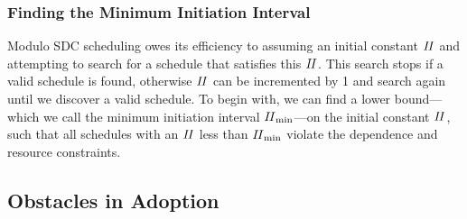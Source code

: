 \subsubsection{Finding the Minimum Initiation Interval}

Modulo SDC scheduling owes its efficiency to assuming an initial constant $\mathit{II}$
and attempting to search for a schedule that satisfies this $\mathit{II}$.  This search
stops if a valid schedule is found, otherwise $\mathit{II}$ can be incremented by 1 and
search again until we discover a valid schedule.  To begin with, we can find
a lower bound---which we call the minimum initiation interval $\mathit{II}_{\rm min}$---on the
initial constant $\mathit{II}$, such that all schedules with an $\mathit{II}$ less than $\mathit{II}_{\rm min}$
violate the dependence and resource constraints.


\subsection{Obstacles in Adoption}
\label{sub:obstacles_in_adoption}


